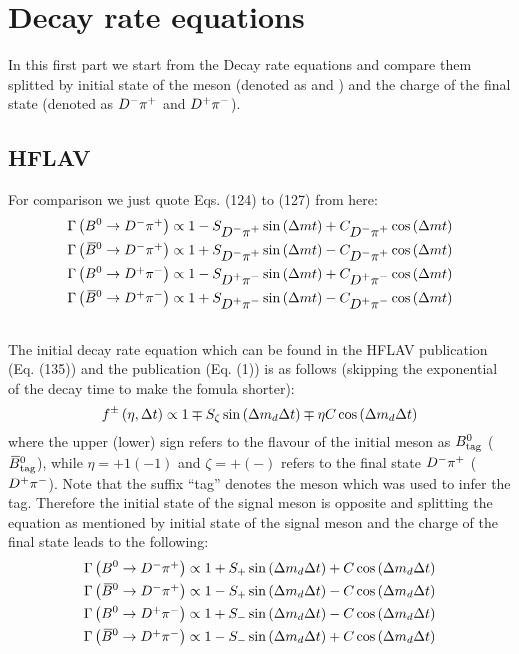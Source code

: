\section{Decay rate equations}
\label{sec:decrateeq}

In this first part we start from the Decay rate equations and compare them splitted by initial state of the \Bz meson
(denoted as \Bz and \Bzb) and the charge of the final state (denoted as $\mbox{\ensuremath{D^{-}\pi^{+}}}$ and $\mbox{\ensuremath{D^{+}\pi^{-}}}$).

\subsection{HFLAV}

For comparison we just quote Eqs. (124) to (127) from \cite{Amhis:2016xyh} here:
\begin{align}
\Gamma\left(B^0\rightarrow \mbox{\ensuremath{D^{-}\pi^{+}}}\right) \propto 1-S_{\mbox{\ensuremath{D^{-}\pi^{+}}}}\sin\left(\Delta m t\right)+C_{\mbox{\ensuremath{D^{-}\pi^{+}}}}\cos\left(\Delta m t\right) \\
\Gamma\left(\kern 0.18em\overline{\kern -0.18em B}{}^0\rightarrow \mbox{\ensuremath{D^{-}\pi^{+}}}\right) \propto 1+S_{\mbox{\ensuremath{D^{-}\pi^{+}}}}\sin\left(\Delta m t\right)-C_{\mbox{\ensuremath{D^{-}\pi^{+}}}}\cos\left(\Delta m t\right) \\
\Gamma\left(B^0\rightarrow \mbox{\ensuremath{D^{+}\pi^{-}}}\right) \propto 1-S_{\mbox{\ensuremath{D^{+}\pi^{-}}}}\sin\left(\Delta m t\right)+C_{\mbox{\ensuremath{D^{+}\pi^{-}}}}\cos\left(\Delta m t\right) \\
\Gamma\left(\kern 0.18em\overline{\kern -0.18em B}{}^0\rightarrow \mbox{\ensuremath{D^{+}\pi^{-}}}\right) \propto 1+S_{\mbox{\ensuremath{D^{+}\pi^{-}}}}\sin\left(\Delta m t\right)-C_{\mbox{\ensuremath{D^{+}\pi^{-}}}}\cos\left(\Delta m t\right)
\end{align}

\subsection{\babar}

The initial decay rate equation which can be found in the HFLAV publication (Eq. (135)) and the \babar publication (Eq. (1)) is
as follows (skipping the exponential of the decay time to make the fomula shorter):
\begin{equation}
f^\pm\left(\eta,\Delta t\right) \propto 1 \mp S_{\zeta}\sin\left(\Delta m_{d}\Delta t\right)\mp\eta C\cos\left(\Delta m_{d}\Delta t\right)
\end{equation}
where the upper (lower) sign refers to the flavour of the initial \Bz meson as $B^0_{\text{tag}}$ ($\kern 0.18em\overline{\kern -0.18em B}{}^0_{\text{tag}}$), while
$\eta=+1 (-1)$ and $\zeta=+(-)$ refers to the final state $\mbox{\ensuremath{D^{-}\pi^{+}}}$ ($\mbox{\ensuremath{D^{+}\pi^{-}}}$). Note that the suffix \enquote{tag} denotes the \B meson
which was used to infer the tag. Therefore the initial state of the signal \B meson is opposite and splitting the equation as
mentioned by initial state of the signal \Bz meson and the charge of the final state leads to the following:
\begin{align}
\Gamma\left(B^0\rightarrow \mbox{\ensuremath{D^{-}\pi^{+}}}\right) \propto 1+S_{+}\sin\left(\Delta m_{d} \Delta t\right)+C\cos\left(\Delta m_{d} \Delta t\right) \\
\Gamma\left(\kern 0.18em\overline{\kern -0.18em B}{}^0\rightarrow \mbox{\ensuremath{D^{-}\pi^{+}}}\right) \propto 1-S_{+}\sin\left(\Delta m_{d} \Delta t\right)-C\cos\left(\Delta m_{d} \Delta t\right) \\
\Gamma\left(B^0\rightarrow \mbox{\ensuremath{D^{+}\pi^{-}}}\right) \propto 1+S_{-}\sin\left(\Delta m_{d} \Delta t\right)-C\cos\left(\Delta m_{d} \Delta t\right) \\
\Gamma\left(\kern 0.18em\overline{\kern -0.18em B}{}^0\rightarrow \mbox{\ensuremath{D^{+}\pi^{-}}}\right) \propto 1-S_{-}\sin\left(\Delta m_{d} \Delta t\right)+C\cos\left(\Delta m_{d} \Delta t\right)
\end{align}

